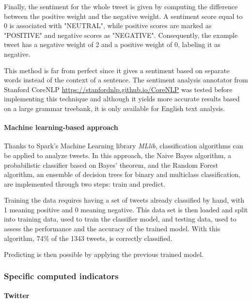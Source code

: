 \documentclass[11pt]{article}
\begin{document}
Finally, the sentiment for the whole tweet is given by computing the difference between the positive weight and the negative weight. A sentiment score equal to 0 is associated with "NEUTRAL", while positive scores are marked as "POSITIVE" and negative scores as "NEGATIVE". Consequently, the example tweet has a negative weight of 2 and a positive weight of 0, labeling it as negative.

This method is far from perfect since it gives a sentiment based on separate words instead of the context of a sentence. The sentiment analysis annotator from Stanford CoreNLP \url{https://stanfordnlp.github.io/CoreNLP} was tested before implementing this technique and although it yields more accurate results based on a large grammar treebank, it is only available for English text analysis.

\paragraph{Machine learning-based approach}

Thanks to Spark's Machine Learning library \textit{MLlib}, classification algorithms can be applied to analyze tweets. In this approach, the Naive Bayes algorithm, a probabilistic classifier based on Bayes' theorem, and the Random Forest algorithm, an ensemble of decision trees for binary and multiclass classification, are implemented through two steps: train and predict.

Training the data requires having a set of tweets already classified by hand, with 1 meaning positive and 0 meaning negative. This data set is then loaded and split into training data, used to train the classifier model, and testing data, used to assess the performance and the accuracy of the trained model.
With this algorithm, 74\% of the 1343 tweets, is correctly classified.

Predicting is then possible by applying the previous trained model.

\subsubsection{Specific computed indicators}

\paragraph{Twitter}

\end{document}
